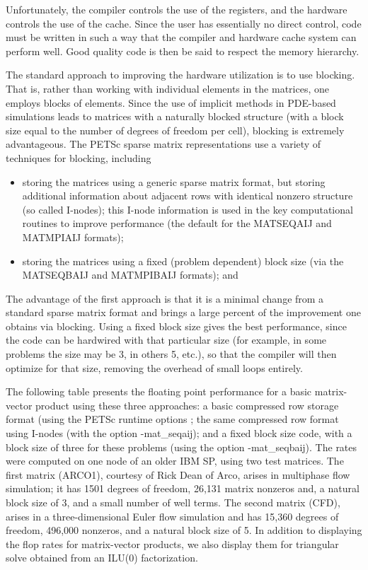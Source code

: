 \documentclass[twoside,12pt]{../sty/report_petsc}
\begin{document}
Unfortunately, the compiler controls the use of the registers, and the
hardware controls the use of the cache. Since the user has essentially
no direct control, code must be written in such a way that the
compiler and hardware cache system can perform well. Good quality code
is then be said to respect the memory hierarchy.

The standard approach to improving the hardware utilization is to use
blocking. That is, rather than working with individual elements in
the matrices, one employs blocks of elements.  Since the use of
implicit methods in PDE-based simulations leads to matrices with a
naturally blocked structure (with a block size equal to the number of
degrees of freedom per cell), blocking is extremely advantageous.  The
PETSc sparse matrix representations use a variety
of techniques for blocking, including

\begin{itemize}
\item storing the matrices using a generic sparse matrix format, but
   storing additional information about adjacent rows with identical
   nonzero structure (so called I-nodes); this I-node information is
   used in the key computational routines to improve performance
   (the default for the MATSEQAIJ and MATMPIAIJ formats);
\item storing the matrices using a fixed (problem dependent) block size
   (via the MATSEQBAIJ and MATMPIBAIJ formats); and
\end{itemize}

The advantage of the first approach is that it is a minimal change
from a standard sparse matrix format and brings a large percent of the
improvement one obtains via blocking.  Using a fixed block size gives
the best performance, since the code can be hardwired with that
particular size (for example, in some problems the size may be 3, in
others 5, etc.), so that the compiler will then optimize for that
size, removing the overhead of small loops entirely.

The following table presents the floating point performance
for a basic matrix-vector product using these three approaches: a basic
compressed row storage format (using the PETSc runtime options
; the same compressed row format using
I-nodes (with the option {-mat\_seqaij}); and a fixed block size code,
with a block size of three for these problems (using the option
{-mat\_seqbaij}). The rates were computed on one
node of an older IBM SP, using two test matrices.  The first matrix
(ARCO1), courtesy of Rick Dean of Arco, arises in multiphase flow
simulation; it has 1501 degrees of freedom, 26,131 matrix nonzeros
and, a natural block size of 3, and a small number of well terms. The
second matrix (CFD), arises in a three-dimensional Euler flow
simulation and has 15,360 degrees of freedom, 496,000 nonzeros, and a
natural block size of 5. In addition to displaying the flop rates for
matrix-vector products, we also display them for triangular solve
obtained from an ILU(0) factorization.
\end{document}
